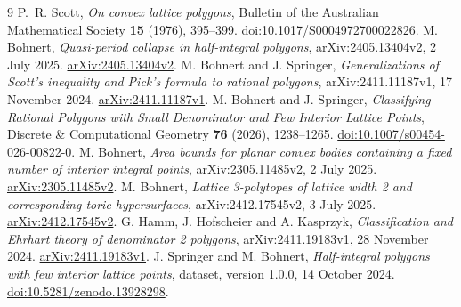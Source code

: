 \documentclass[11pt]{article}
\begin{document}
\begin{thebibliography}{9}
P.~R. Scott, \emph{On convex lattice polygons},
Bulletin of the Australian Mathematical Society \textbf{15} (1976), 395--399.
\href{https://doi.org/10.1017/S0004972700022826}{doi:10.1017/S0004972700022826}.
M. Bohnert, \emph{Quasi-period collapse in half-integral polygons},
arXiv:2405.13404v2, 2 July 2025.
\href{https://arxiv.org/abs/2405.13404v2}{arXiv:2405.13404v2}.
M. Bohnert and J. Springer,
\emph{Generalizations of Scott's inequality and Pick's formula to rational polygons},
arXiv:2411.11187v1, 17 November 2024.
\href{https://arxiv.org/abs/2411.11187v1}{arXiv:2411.11187v1}.
M. Bohnert and J. Springer,
\emph{Classifying Rational Polygons with Small Denominator and Few Interior Lattice Points},
Discrete \& Computational Geometry \textbf{76} (2026), 1238--1265.
\href{https://doi.org/10.1007/s00454-026-00822-0}{doi:10.1007/s00454-026-00822-0}.
M. Bohnert,
\emph{Area bounds for planar convex bodies containing a fixed number of interior integral points},
arXiv:2305.11485v2, 2 July 2025.
\href{https://arxiv.org/abs/2305.11485v2}{arXiv:2305.11485v2}.
M. Bohnert, \emph{Lattice 3-polytopes of lattice width 2 and corresponding toric hypersurfaces},
arXiv:2412.17545v2, 3 July 2025.
\href{https://arxiv.org/abs/2412.17545v2}{arXiv:2412.17545v2}.
G. Hamm, J. Hofscheier and A. Kasprzyk,
\emph{Classification and Ehrhart theory of denominator 2 polygons},
arXiv:2411.19183v1, 28 November 2024.
\href{https://arxiv.org/abs/2411.19183v1}{arXiv:2411.19183v1}.
J. Springer and M. Bohnert,
\emph{Half-integral polygons with few interior lattice points},
dataset, version 1.0.0, 14 October 2024.
\href{https://doi.org/10.5281/zenodo.13928298}{doi:10.5281/zenodo.13928298}.
\end{thebibliography}
\end{document}
